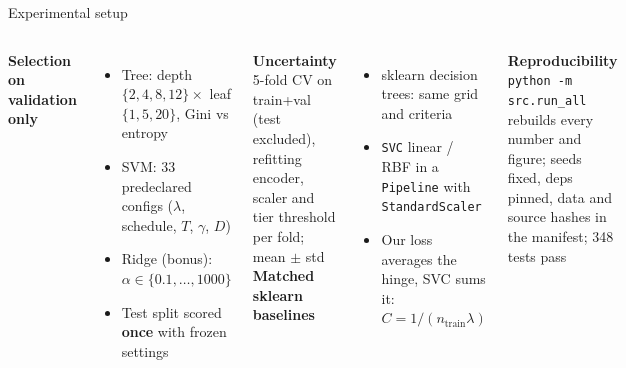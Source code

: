 \documentclass[aspectratio=169,11pt]{beamer}
\newcommand{\hi}[1]{\textcolor{accent}{\textbf{#1}}}
\begin{document}
\begin{frame}{Experimental setup}
  \begin{columns}[T]
    \textbf{Selection on validation only}
    \begin{itemize}\small
      \item Tree: depth $\{2,4,8,12\}\times$ leaf $\{1,5,20\}$, Gini vs entropy
      \item SVM: 33 predeclared configs ($\lambda$, schedule, $T$, $\gamma$, $D$)
      \item Ridge (bonus): $\alpha\in\{0.1,\dots,1000\}$
      \item Test split scored \hi{once} with frozen settings
    \end{itemize}
    \textbf{Uncertainty}\\
    \small 5-fold CV on train+val (test excluded), refitting encoder, scaler and tier threshold per fold; mean $\pm$ std
    \textbf{Matched sklearn baselines}
    \begin{itemize}\small
      \item sklearn decision trees: same grid and criteria
      \item \texttt{SVC} linear / RBF in a \texttt{Pipeline} with \texttt{StandardScaler}
      \item Our loss averages the hinge, SVC sums it:\\
        $C = 1/(n_\text{train}\lambda)$
    \end{itemize}
    \textbf{Reproducibility}\\
    \small \texttt{python -m src.run\_all} rebuilds every number and figure; seeds fixed, deps pinned, data and source hashes in the manifest; 348 tests pass
  \end{columns}
\end{frame}
\end{document}
